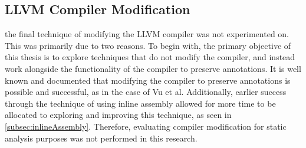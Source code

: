 \subsection{LLVM Compiler Modification}
the final technique of modifying the LLVM compiler was not experimented on. This was primarily due to two reasons. To begin with, the primary objective of this thesis is to explore techniques that do not modify the compiler, and instead work alongside the functionality of the compiler to preserve annotations. It is well known and documented that modifying the compiler to preserve annotations is possible and successful, as in the case of Vu et al. \cite{vu2020secure} Additionally, earlier success through the technique of using inline assembly allowed for more time to be allocated to exploring and improving this technique, as seen in \ref{subsec:inlineAssembly}. Therefore, evaluating compiler modification for static analysis purposes was not performed in this research.

